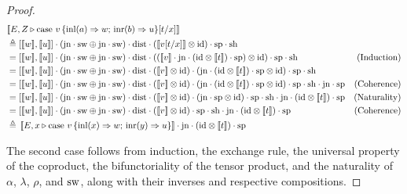 \documentclass[10pt,a4paper]{amsart}
\theoremstyle{definition}
\theoremstyle{definition}
\theoremstyle{definition}
\theoremstyle{definition}
\theoremstyle{definition}
\theoremstyle{definition}
\begin{document}
\begin{proof}
\begin{align*}
  &[\![E, Z \vljud \text{case } v \,  \{\text{inl} (a) \Rightarrow w ;\, \text{inr} (b) \Rightarrow u\} [t/x]]\!] \\
  & \triangleq \left[[\![ w ]\!] ,[\![ u ]\!]\right] \comp (\text{jn}\comp \sw \oplus \text{jn} \comp \sw) \comp \dist \comp  ([\![ v [t/x] ]\!]   \otimes \text{id})  \comp \text{sp} \comp \text{sh} \\
  & = \left[[\![ w ]\!] ,[\![ u ]\!]\right] \comp (\text{jn} \comp \sw \oplus \text{jn} \comp \sw)  \comp \dist \comp (([\![ v]\!]  \comp \text{jn} \comp (\text{id} \otimes [\![  t ]\!] ) \comp \text{sp} )\otimes \text{id})  \comp \text{sp} \comp \text{sh} & {\text{(Induction)}} \\
  & =  \left[[\![ w ]\!] ,[\![ u ]\!]\right] \comp (\text{jn} \comp \sw \oplus \text{jn} \comp \sw)  \comp \dist  \comp ([\![ v]\!] \otimes \text{id}) \comp (\text{jn} \comp (\text{id} \otimes [\![  t ]\!] ) \comp \text{sp} \otimes \text{id})  \comp \text{sp}\comp \text{sh}\\
  & = \left[[\![ w ]\!] ,[\![ u ]\!]\right] \comp (\text{jn} \comp \sw \oplus \text{jn} \comp \sw)  \comp \dist  \comp ([\![ v]\!] \otimes \text{id})  \comp (\text{jn} \comp (\text{id} \otimes [\![  t ]\!] ) \comp \text{sp} \otimes \text{id})  \comp \text{sp} \comp \text{sh} \comp \text{jn} \comp \text{sp} & {(\text{Coherence})} \\
  & = \left[[\![ w ]\!] ,[\![ u ]\!]\right] \comp (\text{jn} \comp \sw \oplus \text{jn} \comp \sw)  \comp \dist  \comp ([\![ v]\!] \otimes \text{id}) \comp (\text{jn}\comp \text{sp} \otimes   \id) \comp \text{sp}   \comp \text{sh} \comp \text{jn}\comp (\text{id} \otimes [\![ t ]\!] ) \comp \text{sp}  & {(\text{Naturality})}   \\
  & = \left[[\![ w ]\!] ,[\![ u ]\!]\right] \comp (\text{jn} \comp \sw \oplus \text{jn}\comp \sw)  \comp \dist  \comp ([\![ v]\!] \otimes \text{id}) \comp \text{sp}  \comp \text{sh}  \comp  \text{jn} \comp (\text{id} \otimes [\![ t ]\!] ) \comp \text{sp}  & {(\text{Coherence})}   \\
  & \triangleq \, [\![E,  x \vljud \text{case } v\,  \{\text{inl} (x) \Rightarrow w ;\, \text{inr} (y) \Rightarrow u\}]\!]  \comp  \text{jn} \comp (\text{id} \otimes [\![ t ]\!] ) \comp \text{sp}
\end{align*}


The second case follows from induction, the exchange rule, the universal property of the coproduct,  the bifunctoriality of the tensor product, and the naturality of $\alpha$, $\lambda$, $\rho$, and $\mathrm{sw}$, along with their inverses and respective compositions.


\end{proof}
\end{document}
